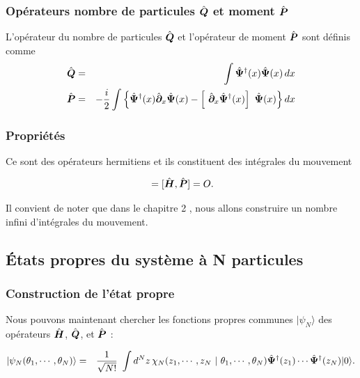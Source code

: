 \subsubsection{Opérateurs nombre de particules $\hat{\bm{Q}}$ et moment $\hat{\bm{P}}$}
L'opérateur du nombre de particules $\hat{\bm{Q}}$ et l'opérateur de moment $\hat{\bm{P}}$ sont définis comme 
\begin{eqnarray}
	\operator{Q} & = & \int \operator{\Psi}^\dag (x) \operator{\Psi} (x) \, d x \\
	\operator{P} & = & - \frac{i}2 \int \left \{  \operator{\Psi}^\dag(x) \operator{\partial}_x \operator{\Psi}(x) - \left [ \operator{\partial}_x \operator{\Psi}^\dag(x)\right ] \operator{\Psi}(x)\right \} dx \label{eq.1.7}
\end{eqnarray}

\subsubsection{Propriétés}

Ce sont des opérateurs hermitiens et ils constituent des intégrales du mouvement

\begin{eqnarray}
	[ \operator{H} , \operator{Q} ] = 	[ \operator{H} , \operator{P} ] = O. 
\end{eqnarray}

Il convient de noter que dans le chapitre 2 , nous allons construire un nombre infini d'intégrales du mouvement.
 
\subsection{États propres du système à N particules}

\subsubsection{Construction de l’état propre}

Nous pouvons maintenant chercher les fonctions propres communes $\vert \psi_N\rangle$ des opérateurs $\hat{\bm{H}}$, $\hat{\bm{Q}}$, et $\hat{\bm{P}}$ :

\begin{eqnarray}
	\vert \psi_N ( \theta_1 , \cdots , \theta_N ) \rangle & = & \frac{1}{\sqrt{N!}} \int d^N z \, \chi_N ( z_1 , \cdots , z_N  ~\vert ~ \theta_1 , \cdots , \theta _N ) \operator{\Psi}^\dag (z_1 ) \cdots \operator{\Psi}^\dag (z_N )	 \vert 0 \rangle. \label{eq.1.9}
\end{eqnarray}

